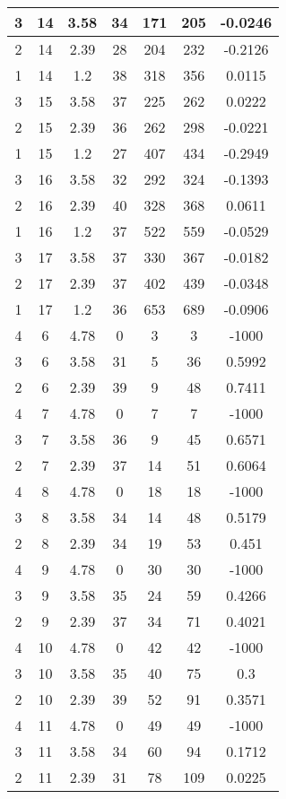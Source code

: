 \documentclass[letterpaper, 12pt]{article}
\begin{document}
\begin{longtable}{|c|c|c|c|c|c|c|}
\hline
3 & 14 & 3.58 & 34 & 171 & 205 & -0.0246 \\
\hline
2 & 14 & 2.39 & 28 & 204 & 232 & -0.2126 \\
\hline
1 & 14 & 1.2 & 38 & 318 & 356 & 0.0115 \\
\hline
3 & 15 & 3.58 & 37 & 225 & 262 & 0.0222 \\
\hline
2 & 15 & 2.39 & 36 & 262 & 298 & -0.0221 \\
\hline
1 & 15 & 1.2 & 27 & 407 & 434 & -0.2949 \\
\hline
3 & 16 & 3.58 & 32 & 292 & 324 & -0.1393 \\
\hline
2 & 16 & 2.39 & 40 & 328 & 368 & 0.0611 \\
\hline
1 & 16 & 1.2 & 37 & 522 & 559 & -0.0529 \\
\hline
3 & 17 & 3.58 & 37 & 330 & 367 & -0.0182 \\
\hline
2 & 17 & 2.39 & 37 & 402 & 439 & -0.0348 \\
\hline
1 & 17 & 1.2 & 36 & 653 & 689 & -0.0906 \\
\hline
4 & 6 & 4.78 & 0 & 3 & 3 & -1000 \\
\hline
3 & 6 & 3.58 & 31 & 5 & 36 & 0.5992 \\
\hline
2 & 6 & 2.39 & 39 & 9 & 48 & 0.7411 \\
\hline
4 & 7 & 4.78 & 0 & 7 & 7 & -1000 \\
\hline
3 & 7 & 3.58 & 36 & 9 & 45 & 0.6571 \\
\hline
2 & 7 & 2.39 & 37 & 14 & 51 & 0.6064 \\
\hline
4 & 8 & 4.78 & 0 & 18 & 18 & -1000 \\
\hline
3 & 8 & 3.58 & 34 & 14 & 48 & 0.5179 \\
\hline
2 & 8 & 2.39 & 34 & 19 & 53 & 0.451 \\
\hline
4 & 9 & 4.78 & 0 & 30 & 30 & -1000 \\
\hline
3 & 9 & 3.58 & 35 & 24 & 59 & 0.4266 \\
\hline
2 & 9 & 2.39 & 37 & 34 & 71 & 0.4021 \\
\hline
4 & 10 & 4.78 & 0 & 42 & 42 & -1000 \\
\hline
3 & 10 & 3.58 & 35 & 40 & 75 & 0.3 \\
\hline
2 & 10 & 2.39 & 39 & 52 & 91 & 0.3571 \\
\hline
4 & 11 & 4.78 & 0 & 49 & 49 & -1000 \\
\hline
3 & 11 & 3.58 & 34 & 60 & 94 & 0.1712 \\
\hline
2 & 11 & 2.39 & 31 & 78 & 109 & 0.0225 \\

\end{longtable}
\end{document}
